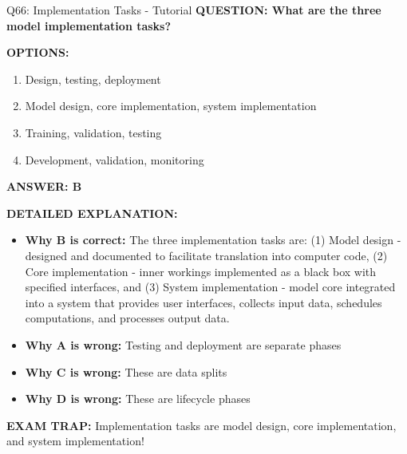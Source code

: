 \documentclass[8pt]{beamer}
\begin{document}
	\begin{frame}{Q66: Implementation Tasks - Tutorial}
		\fontsize{6.5}{7.5}\selectfont
		\textbf{QUESTION: What are the three model implementation tasks?}
		
		\vspace{0.1cm}
		\textbf{OPTIONS:}
		\begin{enumerate}
			\item Design, testing, deployment
			\item Model design, core implementation, system implementation
			\item Training, validation, testing
			\item Development, validation, monitoring
		\end{enumerate}
		
		\vspace{0.1cm}
		\textcolor{myblue}{\textbf{ANSWER: B}}
		
		\vspace{0.1cm}
		\textbf{DETAILED EXPLANATION:}
		\begin{itemize}
			\item \textbf{Why B is correct:} The three implementation tasks are: (1) Model design - designed and documented to facilitate translation into computer code, (2) Core implementation - inner workings implemented as a black box with specified interfaces, and (3) System implementation - model core integrated into a system that provides user interfaces, collects input data, schedules computations, and processes output data.
			\item \textbf{Why A is wrong:} Testing and deployment are separate phases
			\item \textbf{Why C is wrong:} These are data splits
			\item \textbf{Why D is wrong:} These are lifecycle phases
		\end{itemize}
		
		\textcolor{myred}{\textbf{EXAM TRAP:}} Implementation tasks are \textcolor{myblue}{model design, core implementation, and system implementation}!
	\end{frame}
	
\end{document}
